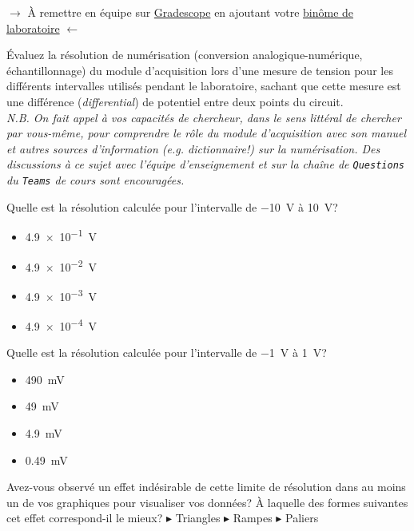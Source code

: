 \documentclass[canadien,12pt,oneside,letterpaper]{article}
\begin{document}
\vspace{-0.5cm}
\noindent$\rightarrow$ À remettre en équipe sur \href{https://www.gradescope.com/}{Gradescope} en ajoutant votre \href{https://help.gradescope.com/article/m5qz2xsnjy-student-add-group-members}{binôme de laboratoire} $\leftarrow$

\begin{gradescope}
\item Évaluez la résolution de numérisation (conversion analogique-numérique, échantillonnage) du module d'acquisition lors d'une mesure de tension pour les différents intervalles utilisés pendant le laboratoire, sachant que cette mesure est une différence (\textit{differential}) de potentiel entre deux points du circuit.\\ \textit{\footnotesize N.B. On fait appel à vos capacités de chercheur, dans le sens littéral de chercher par vous-même, pour comprendre le rôle du module d'acquisition avec son manuel et autres sources d'information (\emph{e.g.} dictionnaire!) sur la numérisation. Des discussions à ce sujet avec l'équipe d'enseignement et sur la chaîne de \texttt{Questions} du \texttt{Teams} de cours sont encouragées.}
    \begin{gradescope}
    \item Quelle est la résolution calculée pour l'intervalle de \qty{-10}{\volt} à \qty{10}{\volt}?
        \begin{itemize}[label=$\blacktriangleright$]
        \item \qty{4.9e-1}{\volt}
        \item \qty{4.9e-2}{\volt}
        \item \qty{4.9e-3}{\volt}
        \item \qty{4.9e-4}{\volt}
        \end{itemize}
    \item Quelle est la résolution calculée pour l'intervalle de \qty{-1}{\volt} à \qty{1}{\volt}?
        \begin{itemize}[label=$\blacktriangleright$]
        \item \qty{490}{\mV}
        \item \qty{49}{\mV}
        \item \qty{4.9}{\mV}
        \item \qty{0.49}{\mV}
        \end{itemize}
    \item Avez-vous observé un effet indésirable de cette limite de résolution dans au moins un de vos graphiques pour visualiser vos données? À laquelle des formes suivantes cet effet correspond-il le mieux? $\blacktriangleright$ Triangles $\blacktriangleright$ Rampes $\blacktriangleright$ Paliers %

\end{gradescope}
\end{gradescope}
\end{document}
